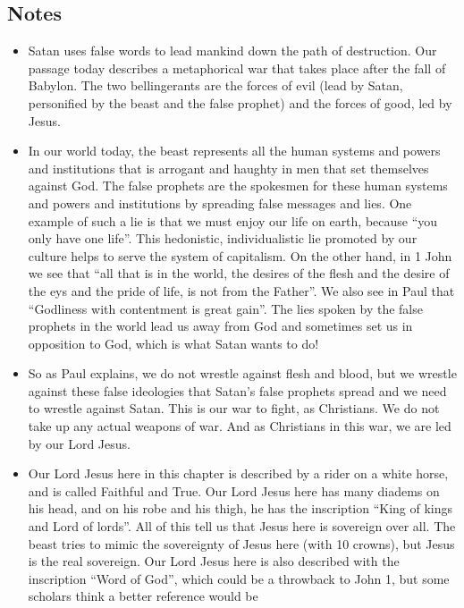 \subsection*{Notes}
\begin{itemize}
  \item{Satan uses false words to lead mankind down the path of destruction.
  Our passage today describes a metaphorical war that takes place after the
  fall of Babylon.  The two bellingerants are the forces of evil (lead by
  Satan, personified by the beast and the false prophet) and the forces of
  good, led by Jesus.}
  \item{In our world today, the beast represents all the human systems and
  powers and institutions that is arrogant and haughty in men that set
  themselves against God.  The false prophets are the spokesmen for these
  human systems and powers and institutions by spreading false messages and
  lies.  One example of such a lie is that we must enjoy our life on earth,
  because ``you only have one life''.  This hedonistic, individualistic lie
  promoted by our culture helps to serve the system of capitalism.  On the
  other hand, in 1 John we see that ``all that is in the world, the desires
  of the flesh and the desire of the eys and the pride of life, is not from
  the Father''.  We also see in Paul that ``Godliness with contentment is
  great gain''.  The lies spoken by the false prophets in the world lead us
  away from God and sometimes set us in opposition to God, which is what
  Satan wants to do!  }
  \item{So as Paul explains, we do not wrestle against flesh and blood, but
  we wrestle against these false ideologies that Satan's false prophets
  spread and we need to wrestle against Satan.  This is our war to fight, as
  Christians.  We do not take up any actual weapons of war.  And as
  Christians in this war, we are led by our Lord Jesus.}
  \item{Our Lord Jesus here in this chapter is described by a rider on a
  white horse, and is called Faithful and True.  Our Lord Jesus here has many
  diadems on his head, and on his robe and his thigh, he has the inscription
  ``King of kings and Lord of lords''.  All of this tell us that Jesus here
  is sovereign over all.  The beast tries to mimic the sovereignty of Jesus
  here (with 10 crowns), but Jesus is the real sovereign.  Our Lord Jesus
  here is also described with the inscription ``Word of God'', which could be
  a throwback to John 1, but some scholars think a better reference would be
}
\end{itemize}
